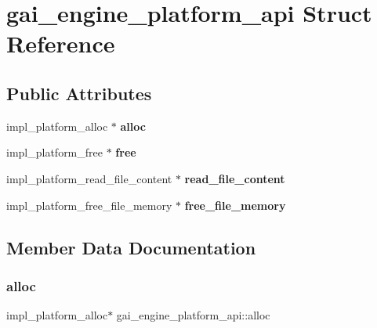 \hypertarget{structgai__engine__platform__api}{}\section{gai\+\_\+engine\+\_\+platform\+\_\+api Struct Reference}
\label{structgai__engine__platform__api}
\subsection*{Public Attributes}
\begin{DoxyCompactItemize}
\item 
\mbox{\label{structgai__engine__platform__api_a55b635f160edefc0148f1e5d49ff080f}} 
impl\+\_\+platform\+\_\+alloc $\ast$ {\bfseries alloc}
\item 
\mbox{\label{structgai__engine__platform__api_a464dadc9755ae2ecba58bc4aca1b6e65}} 
impl\+\_\+platform\+\_\+free $\ast$ {\bfseries free}
\item 
\mbox{\label{structgai__engine__platform__api_a9ee2b129221d6c1472b413a7349d2e43}} 
impl\+\_\+platform\+\_\+read\+\_\+file\+\_\+content $\ast$ {\bfseries read\+\_\+file\+\_\+content}
\item 
\mbox{\label{structgai__engine__platform__api_a2607e3908f036c0aa4af0edb55315503}} 
impl\+\_\+platform\+\_\+free\+\_\+file\+\_\+memory $\ast$ {\bfseries free\+\_\+file\+\_\+memory}
\end{DoxyCompactItemize}


\subsection{Member Data Documentation}
\mbox{\label{structgai__engine__platform__api_a55b635f160edefc0148f1e5d49ff080f}} 
\subsubsection{\texorpdfstring{alloc}{alloc}}
{\footnotesize\ttfamily impl\+\_\+platform\+\_\+alloc$\ast$ gai\+\_\+engine\+\_\+platform\+\_\+api\+::alloc}

